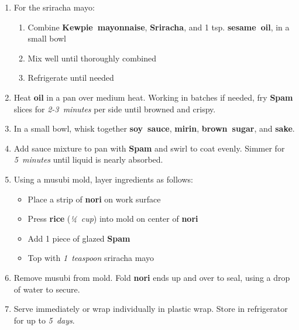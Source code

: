 \documentclass[11pt,letterpaper]{article}
\begin{document}
\begin{enumerate}
    \item For the sriracha mayo:
    \begin{enumerate}
        \item Combine \textbf{Kewpie~mayonnaise}, \textbf{Sriracha}, and 1 tsp. \textbf{sesame~oil}, in a small bowl
        \item Mix well until thoroughly combined
        \item Refrigerate until needed
    \end{enumerate}
    
    \item Heat \textbf{oil} in a pan over medium heat. Working in batches if needed, fry \textbf{Spam} slices for \textit{2-3~minutes} per side until browned and crispy.
    
    \item In a small bowl, whisk together \textbf{soy~sauce}, \textbf{mirin}, \textbf{brown~sugar}, and \textbf{sake}. 
    
    \item Add sauce mixture to pan with \textbf{Spam} and swirl to coat evenly. Simmer for \textit{5~minutes} until liquid is nearly absorbed.
    
    \item Using a musubi mold, layer ingredients as follows:
    \begin{itemize}
        \item Place a strip of \textbf{nori} on work surface
        \item Press \textbf{rice} (\textit{¼~cup}) into mold on center of \textbf{nori}
        \item Add 1 piece of glazed \textbf{Spam}
        \item Top with \textit{1~teaspoon} sriracha mayo
    \end{itemize}
    
    \item Remove musubi from mold. Fold \textbf{nori} ends up and over to seal, using a drop of water to secure.
    
    \item Serve immediately or wrap individually in plastic wrap. Store in refrigerator for up to \textit{5~days}.
\end{enumerate}
\end{document}
